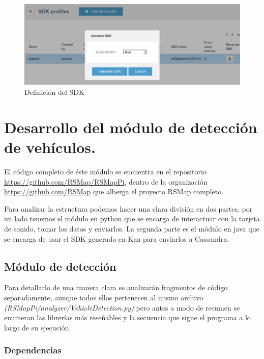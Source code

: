 \begin{figure}[!ht]
  \begin{center}
    \includegraphics[scale=0.30]{../images/sdk/2.png}
		\caption{Definición del SDK}
    \label{fig:kaa}
	\end{center}
\end{figure}

\newpage

\section{Desarrollo del módulo de detección de vehículos.}

El código completo de éste módulo se encuentra en el repositorio \url{https://github.com/RSMap/RSMapPi}, dentro de la organización \url{https://github.com/RSMap} que alberga el proyecto RSMap completo.

\bigskip

Para analizar la estructura podemos hacer una clara división en dos partes, por un lado tenemos el módulo en python que se encarga de interactuar con la tarjeta de sonido, tomar los datos y enviarlos. La segunda parte es el módulo en java que se encarga de usar el SDK generado en Kaa para enviarlos a Cassandra.

\subsection{Módulo de detección}

Para detallarlo de una manera clara se analizarán fragmentos de código separadamente, aunque todos ellos pertenecen al mismo archivo \textit{(RSMapPi/\/analyzer/\/VehicleDetection.py)} pero antes a modo de resumen se enumeran las librerías más reseñables y la secuencia que sigue el programa a lo largo de su ejecución.

\subsubsection{Dependencias}

